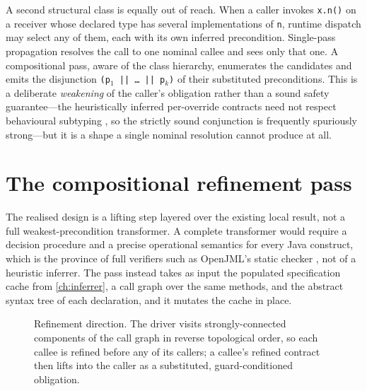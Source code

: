 A second structural class is equally out of reach. When a caller invokes
\texttt{x.n()} on a receiver whose declared type has several implementations of
\texttt{n}, runtime dispatch may select any of them, each with its own inferred
precondition. Single-pass propagation resolves the call to one nominal callee
and sees only that one. A compositional pass, aware of the class hierarchy,
enumerates the candidates and emits the disjunction
\texttt{(p\(_1\) || \dots\ || p\(_k\))} of their substituted preconditions.
This is a deliberate \emph{weakening} of the caller's obligation rather than a
sound safety guarantee---the heuristically inferred per-override contracts need
not respect behavioural subtyping \citep{mostafa2017behavioral}, so the strictly
sound conjunction is frequently spuriously strong---but it is a shape a single
nominal resolution cannot produce at all.

\section{The compositional refinement pass}
\label{sec:comp-pass}

The realised design is a lifting step layered over the existing local result,
not a full weakest-precondition transformer. A complete transformer would
require a decision procedure and a precise operational semantics for every Java
construct, which is the province of full verifiers such as OpenJML's static
checker \citep{cok2014openjml,leavens2006jml}, not of a heuristic inferrer. The
pass instead takes as input the populated specification cache from
\cref{ch:inferrer}, a call graph over the same methods, and the abstract syntax
tree of each declaration, and it mutates the cache in place.

\begin{figure}[t]
\centering
{}
\caption{Refinement direction. The driver visits strongly-connected components
of the call graph in reverse topological order, so each callee is refined before
any of its callers; a callee's refined contract then lifts into the caller as a
substituted, guard-conditioned obligation.}
\label{fig:comp-callgraph}
\end{figure}

